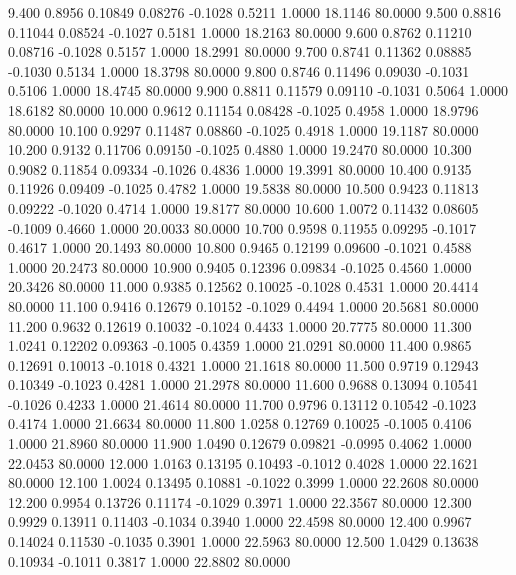    9.400   0.8956   0.10849   0.08276  -0.1028   0.5211   1.0000  18.1146  80.0000
   9.500   0.8816   0.11044   0.08524  -0.1027   0.5181   1.0000  18.2163  80.0000
   9.600   0.8762   0.11210   0.08716  -0.1028   0.5157   1.0000  18.2991  80.0000
   9.700   0.8741   0.11362   0.08885  -0.1030   0.5134   1.0000  18.3798  80.0000
   9.800   0.8746   0.11496   0.09030  -0.1031   0.5106   1.0000  18.4745  80.0000
   9.900   0.8811   0.11579   0.09110  -0.1031   0.5064   1.0000  18.6182  80.0000
  10.000   0.9612   0.11154   0.08428  -0.1025   0.4958   1.0000  18.9796  80.0000
  10.100   0.9297   0.11487   0.08860  -0.1025   0.4918   1.0000  19.1187  80.0000
  10.200   0.9132   0.11706   0.09150  -0.1025   0.4880   1.0000  19.2470  80.0000
  10.300   0.9082   0.11854   0.09334  -0.1026   0.4836   1.0000  19.3991  80.0000
  10.400   0.9135   0.11926   0.09409  -0.1025   0.4782   1.0000  19.5838  80.0000
  10.500   0.9423   0.11813   0.09222  -0.1020   0.4714   1.0000  19.8177  80.0000
  10.600   1.0072   0.11432   0.08605  -0.1009   0.4660   1.0000  20.0033  80.0000
  10.700   0.9598   0.11955   0.09295  -0.1017   0.4617   1.0000  20.1493  80.0000
  10.800   0.9465   0.12199   0.09600  -0.1021   0.4588   1.0000  20.2473  80.0000
  10.900   0.9405   0.12396   0.09834  -0.1025   0.4560   1.0000  20.3426  80.0000
  11.000   0.9385   0.12562   0.10025  -0.1028   0.4531   1.0000  20.4414  80.0000
  11.100   0.9416   0.12679   0.10152  -0.1029   0.4494   1.0000  20.5681  80.0000
  11.200   0.9632   0.12619   0.10032  -0.1024   0.4433   1.0000  20.7775  80.0000
  11.300   1.0241   0.12202   0.09363  -0.1005   0.4359   1.0000  21.0291  80.0000
  11.400   0.9865   0.12691   0.10013  -0.1018   0.4321   1.0000  21.1618  80.0000
  11.500   0.9719   0.12943   0.10349  -0.1023   0.4281   1.0000  21.2978  80.0000
  11.600   0.9688   0.13094   0.10541  -0.1026   0.4233   1.0000  21.4614  80.0000
  11.700   0.9796   0.13112   0.10542  -0.1023   0.4174   1.0000  21.6634  80.0000
  11.800   1.0258   0.12769   0.10025  -0.1005   0.4106   1.0000  21.8960  80.0000
  11.900   1.0490   0.12679   0.09821  -0.0995   0.4062   1.0000  22.0453  80.0000
  12.000   1.0163   0.13195   0.10493  -0.1012   0.4028   1.0000  22.1621  80.0000
  12.100   1.0024   0.13495   0.10881  -0.1022   0.3999   1.0000  22.2608  80.0000
  12.200   0.9954   0.13726   0.11174  -0.1029   0.3971   1.0000  22.3567  80.0000
  12.300   0.9929   0.13911   0.11403  -0.1034   0.3940   1.0000  22.4598  80.0000
  12.400   0.9967   0.14024   0.11530  -0.1035   0.3901   1.0000  22.5963  80.0000
  12.500   1.0429   0.13638   0.10934  -0.1011   0.3817   1.0000  22.8802  80.0000
